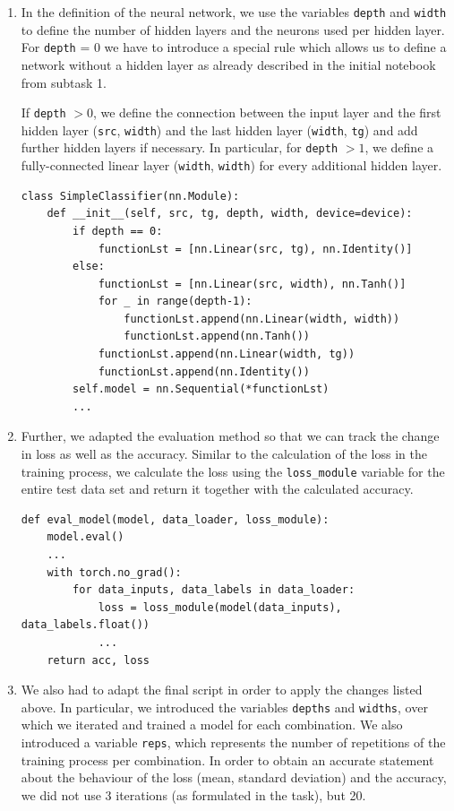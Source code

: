 \begin{enumerate}
    \item In the definition of the neural network, we use the variables \lstinline|depth| and \lstinline|width| to define the number of hidden layers and the neurons used per hidden layer. For \lstinline|depth| = 0 we have to introduce a special rule which allows us to define a network without a hidden layer as already described in the initial notebook from subtask 1. 

If \lstinline|depth| $> 0$, we define the connection between the input layer and the first hidden layer (\lstinline|src|, \lstinline|width|) and the last hidden layer (\lstinline|width|, \lstinline|tg|) and add further hidden layers if necessary. In particular, for \lstinline|depth| $> 1$, we define a fully-connected linear layer (\lstinline|width|, \lstinline|width|) for every additional hidden layer. 
\begin{lstlisting}
class SimpleClassifier(nn.Module):
    def __init__(self, src, tg, depth, width, device=device):
        if depth == 0:
            functionLst = [nn.Linear(src, tg), nn.Identity()]
        else:
            functionLst = [nn.Linear(src, width), nn.Tanh()]
            for _ in range(depth-1):
                functionLst.append(nn.Linear(width, width))
                functionLst.append(nn.Tanh())
            functionLst.append(nn.Linear(width, tg))
            functionLst.append(nn.Identity())
        self.model = nn.Sequential(*functionLst)
        ...
\end{lstlisting}
\item Further, we adapted the evaluation method so that we can track the change in loss as well as the accuracy. Similar to the calculation of the loss in the training process, we calculate the loss using the \lstinline|loss_module| variable for the entire test data set and return it together with the calculated accuracy.
\begin{lstlisting}
def eval_model(model, data_loader, loss_module):
    model.eval() 
    ...
    with torch.no_grad():
        for data_inputs, data_labels in data_loader:
            loss = loss_module(model(data_inputs), data_labels.float())
            ...
    return acc, loss
\end{lstlisting}
\item We also had to adapt the final script in order to apply the changes listed above. In particular, we introduced the variables \lstinline|depths| and \lstinline|widths|, over which we iterated and trained a model for each combination. We also introduced a variable \lstinline|reps|, which represents the number of repetitions of the training process per combination. In order to obtain an accurate statement about the behaviour of the loss (mean, standard deviation) and the accuracy, we did not use 3 iterations (as formulated in the task), but 20. 


\end{enumerate}
